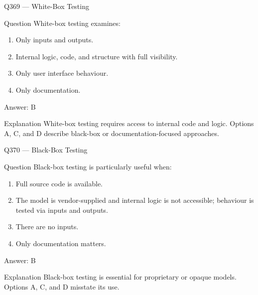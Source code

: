 \documentclass[aspectratio=169,8pt]{beamer}
\begin{document}
	\begin{frame}{Q369 --- White-Box Testing}
		\begin{block}{Question}
			White-box testing examines:
			\begin{enumerate}
				\item Only inputs and outputs.
				\item Internal logic, code, and structure with full visibility.
				\item Only user interface behaviour.
				\item Only documentation.
			\end{enumerate}
		\end{block}
		\begin{exampleblock}{Answer: B}\end{exampleblock}
		\begin{block}{Explanation}
			White-box testing requires access to internal code and logic. Options A, C, and D describe black-box or documentation-focused approaches.
		\end{block}
	\end{frame}
	
	\begin{frame}{Q370 --- Black-Box Testing}
		\begin{block}{Question}
			Black-box testing is particularly useful when:
			\begin{enumerate}
				\item Full source code is available.
				\item The model is vendor-supplied and internal logic is not accessible; behaviour is tested via inputs and outputs.
				\item There are no inputs.
				\item Only documentation matters.
			\end{enumerate}
		\end{block}
		\begin{exampleblock}{Answer: B}\end{exampleblock}
		\begin{block}{Explanation}
			Black-box testing is essential for proprietary or opaque models. Options A, C, and D misstate its use.
		\end{block}
	\end{frame}
	
\end{document}
